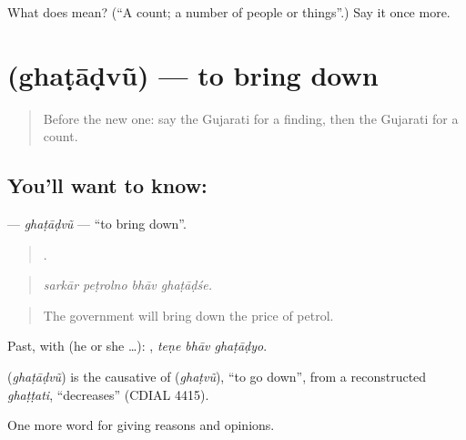 \begin{tcolorbox}[breakable,colback=teal!4,colframe=teal!35!black,title={Before you move on}]
What does  mean? (\textquotedblleft{}A count; a number of people or things\textquotedblright{}.) Say it once more.
\end{tcolorbox}
\section[\texorpdfstring{\gu{ઘટાડવું} (ghaṭāḍvũ)}{ઘટાડવું (ghaṭāḍvũ)}]{ (ghaṭāḍvũ) — to bring down}

\label{lesson:GU-C363-ghatadvu}



\begin{quote}
Before the new one: say the Gujarati for a finding, then the Gujarati for a count.
\end{quote}

\subsection*{You'll want to know: }
\textbf{} — \emph{ghaṭāḍvũ} — \textquotedblleft{}to bring down\textquotedblright{}.

\begin{quote}
   .
\end{quote}

\begin{quote}
\emph{sarkār peṭrolno bhāv ghaṭāḍśe.}
\end{quote}

\begin{quote}
The government will bring down the price of petrol.
\end{quote}

Past, with  (he or she …):   , \emph{teṇe bhāv ghaṭāḍyo}.

\begin{cousinweb}
\textbf{} (\emph{ghaṭāḍvũ}) is the causative of \textbf{} (\emph{ghaṭvũ}), \textquotedblleft{}to go down\textquotedblright{}, from a reconstructed \emph{ghaṭṭati}, \textquotedblleft{}decreases\textquotedblright{} (CDIAL 4415).
\end{cousinweb}

\begin{grammarlens}[title={What you've built}]
One more word for giving reasons and opinions.
\end{grammarlens}

